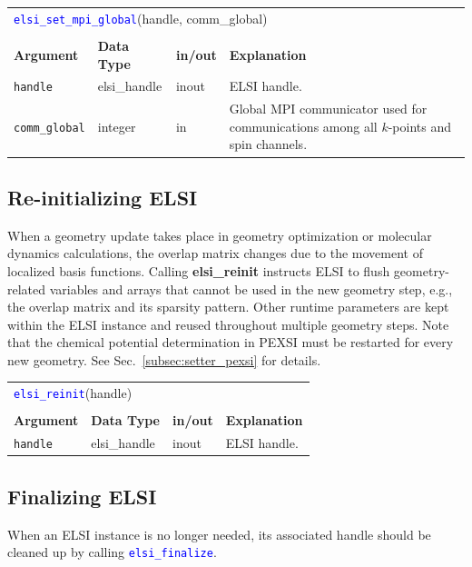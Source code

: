 \documentclass{report}
\newcommand{\api}[1]{\textcolor{blue}{\texttt{#1}}}
\begin{document}
\begin{tabular}[]{|p{20mm}|p{20mm}|p{10mm}|p{112mm}|}
\multicolumn{4}{l}{\api{elsi\_set\_mpi\_global}(handle, comm\_global)}\\
\multicolumn{4}{l}{}\\
\hline
\multicolumn{1}{|l|}{\textbf{Argument}} & \multicolumn{1}{l|}{\textbf{Data Type}} & \multicolumn{1}{l|}{\textbf{in/out}} & \multicolumn{1}{l|}{\textbf{Explanation}}\\
\hline
\texttt{handle}       & elsi\_handle & inout & ELSI handle.\\
\hline
\texttt{comm\_global} & integer      & in    & Global MPI communicator used for communications among all $k$-points and spin channels.\\
\hline
\end{tabular}

\subsection{Re-initializing ELSI}
\label{subsec:setup_reinit}
When a geometry update takes place in geometry optimization or molecular dynamics calculations, the overlap matrix changes due to the movement of localized basis functions. Calling \textbf{elsi\_reinit} instructs ELSI to flush geometry-related variables and arrays that cannot be used in the new geometry step, e.g., the overlap matrix and its sparsity pattern. Other runtime parameters are kept within the ELSI instance and reused throughout multiple geometry steps. Note that the chemical potential determination in PEXSI must be restarted for every new geometry. See Sec.~\ref{subsec:setter_pexsi} for details.

\begin{tabular}[]{|p{20mm}|p{20mm}|p{10mm}|p{112mm}|}
\multicolumn{4}{l}{\api{elsi\_reinit}(handle)}\\
\multicolumn{4}{l}{}\\
\hline
\multicolumn{1}{|l|}{\textbf{Argument}} & \multicolumn{1}{l|}{\textbf{Data Type}} & \multicolumn{1}{l|}{\textbf{in/out}} & \multicolumn{1}{l|}{\textbf{Explanation}}\\
\hline
\texttt{handle} & elsi\_handle & inout & ELSI handle.\\
\hline
\end{tabular}

\subsection{Finalizing ELSI}
\label{subsec:setup_final}
When an ELSI instance is no longer needed, its associated handle should be cleaned up by calling \api{elsi\_finalize}.
\end{document}
